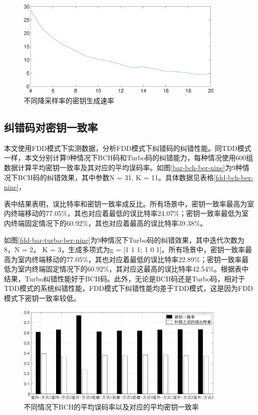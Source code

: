 \documentclass[master]{seuthesis} %
\begin{document}
\begin{Main}
\begin{figure}[htbp!]
    \centering \includegraphics[width=0.9\textwidth]{images/fdd-keyrate.eps}
    \caption{不同降采样率的密钥生成速率}
    \label{fdd-keyrate}
\end{figure}


\subsection{纠错码对密钥一致率}

本文使用FDD模式下实测数据，分析FDD模式下纠错码的纠错性能。同TDD模式一样，本文分别计算9种情况下BCH码和Turbo码的纠错能力，每种情况使用600组数据计算平均密钥一致率及其对应的平均误码率。如图\ref{bar-bch-ber-nine}为9种情况下BCH码的纠错效果，其中参数N = 31, K = 11。具体数据见表格\ref{fdd-bch-ber-nine}，


表中结果表明，误比特率和密钥一致率成反比。所有场景中，密钥一致率最高为室内终端移动的77.05\%，其也对应着最低的误比特率24.07\%；密钥一致率最低为室内终端固定情况下的60.92\%，其也对应着最高的误比特率39.38\%。

如图\ref{fdd-bar-turbo-ber-nine}为9种情况下Turbo码的纠错效果，其中迭代次数为8，N = 2， K = 3，生成多项式为g = [1 1 1; 1 0 1]。所有场景中，密钥一致率最高为室内终端移动的77.05\%，其也对应着最低的误比特率22.89\%；密钥一致率最低为室内终端固定情况下的60.92\%，其对应这最高的误比特率42.54\%。根据表中结果，Turbo纠错性能好于BCH码。此外，无论是BCH码还是Turbo码，相对于TDD模式的系统纠错性能，FDD模式下纠错性能均差于TDD模式，这是因为FDD模式下密钥一致率较低。

\begin{figure}[htbp!]
    \centering \includegraphics[width=0.9\textwidth]{images/fdd-encode/bch-ber-nine.eps}
    \caption{不同情况下BCH的平均误码率以及对应的平均密钥一致率}
    \label{fdd-bar-bch-ber-nine}
\end{figure}


\end{Main}
\end{document}

